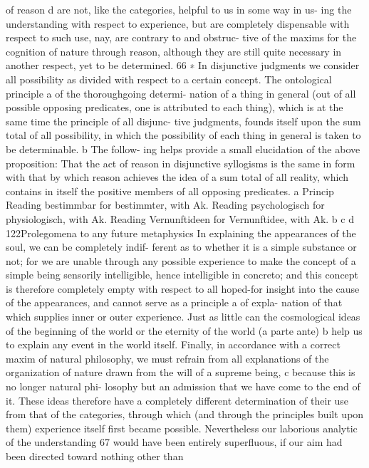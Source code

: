 of reason d are not, like the categories, helpful to us in some way in us-
ing the understanding with respect to experience, but are completely
dispensable with respect to such use, nay, are contrary to and obstruc-
tive of the maxims for the cognition of nature through reason, although
they are still quite necessary in another respect, yet to be determined. 66
∗ In disjunctive judgments we consider all possibility as divided with respect to
a certain concept. The ontological principle a of the thoroughgoing determi-
nation of a thing in general (out of all possible opposing predicates, one is
attributed to each thing), which is at the same time the principle of all disjunc-
tive judgments, founds itself upon the sum total of all possibility, in which the
possibility of each thing in general is taken to be determinable. b The follow-
ing helps provide a small elucidation of the above proposition: That the act of
reason in disjunctive syllogisms is the same in form with that by which reason
achieves the idea of a sum total of all reality, which contains in itself the positive
members of all opposing predicates.
a Princip
Reading bestimmbar for bestimmter, with Ak.
Reading psychologisch for physiologisch, with Ak.
Reading Vernunftideen for Vernunftidee, with Ak.
b
c
d
122Prolegomena to any future metaphysics
In explaining the appearances of the soul, we can be completely indif-
ferent as to whether it is a simple substance or not; for we are unable
through any possible experience to make the concept of a simple being
sensorily intelligible, hence intelligible in concreto; and this concept is
therefore completely empty with respect to all hoped-for insight into
the cause of the appearances, and cannot serve as a principle a of expla-
nation of that which supplies inner or outer experience. Just as little can
the cosmological ideas of the beginning of the world or the eternity of
the world (a parte ante) b help us to explain any event in the world itself.
Finally, in accordance with a correct maxim of natural philosophy, we
must refrain from all explanations of the organization of nature drawn
from the will of a supreme being, c because this is no longer natural phi-
losophy but an admission that we have come to the end of it. These
ideas therefore have a completely different determination of their use
from that of the categories, through which (and through the principles
built upon them) experience itself ﬁrst became possible. Nevertheless
our laborious analytic of the understanding 67 would have been entirely
superﬂuous, if our aim had been directed toward nothing other than

